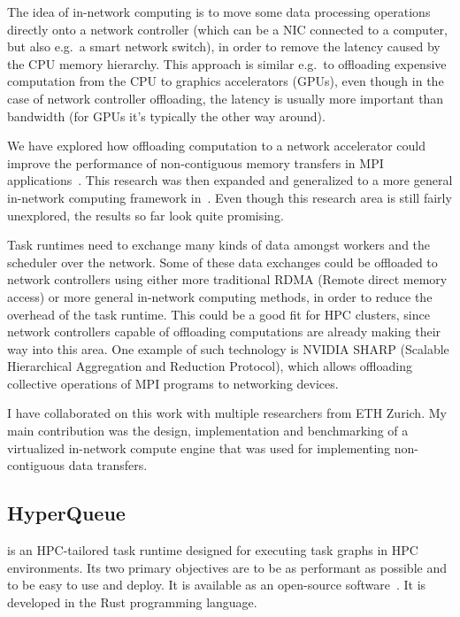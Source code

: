 The idea of in-network computing is to move some data processing operations directly onto a
network controller (which can be a NIC connected to a computer, but also e.g.\ a smart network
switch), in order to remove the latency caused by the CPU memory hierarchy. This
approach is similar e.g.\ to offloading expensive computation from the CPU to graphics
accelerators (GPUs), even though in the case of network controller offloading, the latency is
usually more important than bandwidth (for GPUs it's typically the other way around).

We have explored how offloading computation to a network accelerator could improve the
performance of non-contiguous memory transfers in MPI applications~\cite{spin}. This
research was then expanded and generalized to a more general in-network computing framework
in~\cite{spin2}. Even though this research area is still fairly unexplored, the results so far
look quite promising.

Task runtimes need to exchange many kinds of data amongst workers and the scheduler over
the network. Some of these data exchanges could be offloaded to network controllers using either
more traditional RDMA (Remote direct memory access) or more general in-network computing
methods, in order to reduce the overhead of the task runtime. This could be a good fit for HPC
clusters, since network controllers capable of offloading computations are already making their
way into this area. One example of such technology is NVIDIA SHARP (Scalable Hierarchical
Aggregation and Reduction Protocol), which allows offloading collective operations of MPI
programs to networking devices.

I have collaborated on this work with multiple researchers from ETH Zurich. My main
contribution was the design, implementation and benchmarking of a virtualized in-network compute
engine that was used for implementing non-contiguous data transfers.

\subsection{HyperQueue}
\label{subsec:hyperqueue}
\hyperqueue{} is an HPC-tailored task runtime designed for executing task graphs in HPC
environments.
Its two primary objectives are to be as performant as possible and to be easy to use and deploy.
It is available as an open-source software~.
It is developed in the Rust programming language.

